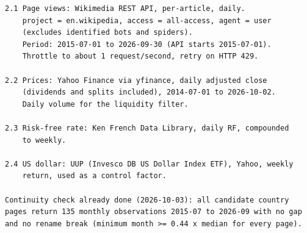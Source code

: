 \begin{Verbatim}[fontsize=\footnotesize, frame=single, framerule=0.3pt, rulecolor=\color{black!35}, framesep=2.5mm, samepage=true, label={\textcolor{black}{\textbf{2. DATA}}}]
2.1 Page views: Wikimedia REST API, per-article, daily.
    project = en.wikipedia, access = all-access, agent = user
    (excludes identified bots and spiders).
    Period: 2015-07-01 to 2026-09-30 (API starts 2015-07-01).
    Throttle to about 1 request/second, retry on HTTP 429.

2.2 Prices: Yahoo Finance via yfinance, daily adjusted close
    (dividends and splits included), 2014-07-01 to 2026-10-02.
    Daily volume for the liquidity filter.

2.3 Risk-free rate: Ken French Data Library, daily RF, compounded
    to weekly.

2.4 US dollar: UUP (Invesco DB US Dollar Index ETF), Yahoo, weekly
    return, used as a control factor.

Continuity check already done (2026-10-03): all candidate country
pages return 135 monthly observations 2015-07 to 2026-09 with no gap
and no rename break (minimum month >= 0.44 x median for every page).
\end{Verbatim}

